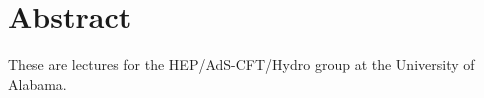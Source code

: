\chapter*{Abstract}
These are lectures for the HEP/AdS-CFT/Hydro group at the University of Alabama.
